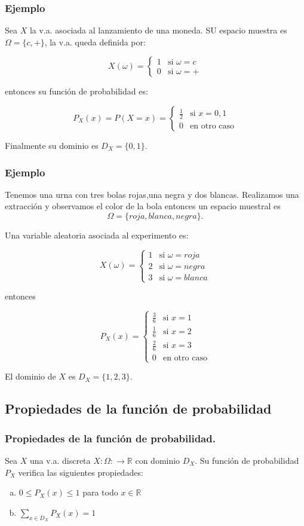 \documentclass[handout]{beamer}\usepackage[]{graphicx}\usepackage[]{color}
\newcommand{\RR}{\mathbb{R}}
\renewcommand{\leq}{\leqslant}
\theoremstyle{plain}
\theoremstyle{definition}
\begin{document}
\begin{frame}

\frametitle{Ejemplo}
Sea $X$ la v.a. asociada al lanzamiento de una moneda. SU espacio muestra es  $\Omega=\{c,+\}$, la v.a. queda definida por:

$$X(\omega)=\left\{\begin{array}{ll} 1 & \mbox{si } \omega=c \\
0 & \mbox{si }\omega=+\end{array}\right.$$

entonces su función de probabilidad es:

$$P_{X}(x)=P(X=x)=\left\{\begin{array}{ll} \frac{1}{2} & \mbox{si } x=0,1\\
0 & \mbox{en otro caso}\end{array}\right.$$


Finalmente su dominio es $D_X=\{0,1\}.$
\end{frame}



\begin{frame}
\frametitle{Ejemplo} 
Tenemos una urna con tres bolas rojas,una negra y dos blancas. Realizamos una extracción y observamos el color de la bola entonces un espacio muestral es
$$\Omega=\{roja, blanca, negra\}.$$ 

Una variable aleatoria asociada al experimento es:

$$X(\omega)=\left\{\begin{array}{ll} 1 & \mbox{si } \omega=roja  \\
2 & \mbox{si }\omega=negra \\ 3 & \mbox{si } \omega=blanca \end{array}\right.$$

entonces

$$P_{X}(x)=\left\{\begin{array}{ll} \frac{3}{6} & \mbox{si } x=1\\
\frac{1}{6} & \mbox{si } x=2\\ \frac{2}{6} & \mbox{si } x=3\\ 0 & \mbox{en otro
caso}\end{array}\right.$$

El dominio de $X$ es $D_X=\{1,2,3\}.$

\end{frame}

\subsection{Propiedades de la función de probabilidad}
\begin{frame}

\frametitle{Propiedades de la función de probabilidad.}
 Sea $X$ una v.a. discreta $X:\Omega:\to\RR$ con dominio $D_X$. Su función de probabilidad $P_{X}$ verifica las siguientes propiedades:
\begin{enumerate}[a)]
\item $0\leq P_{X}(x)\leq 1$ para todo $x\in\RR$
\item $\sum\limits_{x\in D_X} P_{X}(x)=1$
\end{enumerate}
\end{frame}
\end{document}
